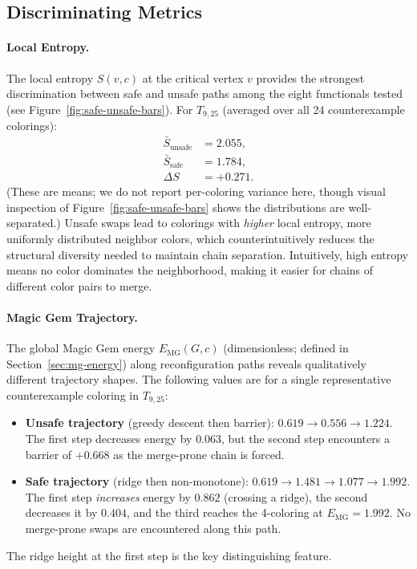 \subsection{Discriminating Metrics}\label{sec:discriminating}

\paragraph{Local Entropy.}
The local entropy $S(v, c)$ at the critical vertex $v$ provides the
strongest discrimination between safe and unsafe paths among the eight
functionals tested (see Figure~\ref{fig:safe-unsafe-bars}).
For $T_{9,25}$ (averaged over all 24 counterexample colorings):
\begin{align}
  \bar{S}_{\text{unsafe}} &= 2.055, \label{eq:entropy-unsafe} \\
  \bar{S}_{\text{safe}} &= 1.784, \label{eq:entropy-safe} \\
  \Delta S &= +0.271. \label{eq:entropy-delta}
\end{align}
(These are means; we do not report per-coloring variance here, though
visual inspection of Figure~\ref{fig:safe-unsafe-bars} shows the
distributions are well-separated.)
Unsafe swaps lead to colorings with \emph{higher} local entropy,
more uniformly distributed neighbor colors, which counterintuitively
reduces the structural diversity needed to maintain chain separation.
Intuitively, high entropy means no color dominates the neighborhood,
making it easier for chains of different color pairs to merge.

\paragraph{Magic Gem Trajectory.}
The global Magic Gem energy $E_{\mathrm{MG}}(G, c)$ (dimensionless;
defined in Section~\ref{sec:mg-energy}) along reconfiguration paths
reveals qualitatively different trajectory shapes.  The following values
are for a single representative counterexample coloring in $T_{9,25}$:
\begin{itemize}
  \item \textbf{Unsafe trajectory} (greedy descent then barrier):
    $0.619 \to 0.556 \to 1.224$. The first step decreases energy
    by $0.063$, but the second step encounters a barrier of $+0.668$
    as the merge-prone chain is forced.
  \item \textbf{Safe trajectory} (ridge then non-monotone):
    $0.619 \to 1.481 \to 1.077 \to 1.992$. The first step
    \emph{increases} energy by $0.862$ (crossing a ridge), the second
    decreases it by $0.404$, and the third reaches the 4-coloring at
    $E_{\mathrm{MG}} = 1.992$. No merge-prone swaps are encountered
    along this path.
\end{itemize}
The ridge height at the first step is the key distinguishing feature.


